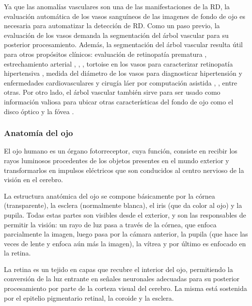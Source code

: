 Ya que las anomal\'ias vasculares son una de las manifestaciones de la RD, la evaluaci\'on autom\'atica de los vasos sangu\'ineos de las imagenes de fondo de ojo es necesaria para automatizar la detecci\'on de RD. Como un paso previo, la evaluaci\'on de los vasos demanda la segmentaci\'on del \'arbol vascular para su posterior procesamiento. Adem\'as, la segmentaci\'on del \'arbol vascular resulta \'util para otros prop\'ositos cl\'inicos: evaluaci\'on de retinopat\'ia prematura \cite{heneghan2002characterization}, estrechamiento arterial \cite{grisan2003divide}, \cite{grisan2003divide}, \cite{ hatanaka2004automated}, tortoise en los vasos para caracterizar retinopat\'ia hipertensiva \cite{foracchia2001extraction}, medida del di\'ametro de los vasos para diagnosticar hipertensi\'on y enfermedades cardiovasculares \cite{gao2001method}  \cite{lowell2004measurement} y cirug\'ia l\'aer por computaci\'on asistida \cite{becker1998image}, \cite{shen2001optimal}, entre otras.
Por otro lado, el \'arbol vascular tambi\'en sirve para ser usado como informaci\'on valiosa para ubicar otras caracter\'isticas del fondo de ojo como el disco \'optico \cite{hoover2003locating} \cite{youssif2008optic} y la f\'ovea \cite{li2004automated}. \cite{marin2011new}


		\subsubsection{Anatom\'ia del ojo}

El ojo humano es un \'organo fotorreceptor, cuya funci\'on, consiste en recibir los rayos luminosos procedentes de los objetos presentes en el mundo exterior y transformarlos en impulsos el\'ectricos que son conducidos al centro nervioso de la visi\'on en el cerebro. 

La estructura anat\'omica del ojo se compone b\'asicamente por la c\'ornea (transparente), la esclera (normalmente blanca), el iris (que da color al ojo) y la pupila. Todas estas partes son visibles desde el exterior, y son las responsables de permitir la visi\'on: un rayo de luz pasa a trav\'es de la c\'ornea, que enfoca parcialmente la imagen, luego pasa por la c\'amara anterior, la pupila (que hace las veces de lente y enfoca a\'un m\'as la imagen), la v\'itrea y por \'ultimo es enfocado en la retina.

La retina es un tejido en capas que recubre el interior del ojo, permitiendo la conversi\'on de la luz entrante en señales neuronales adecuadas para su posterior procesamiento por parte de la corteza visual del cerebro. La misma est\'a sostenida por el epitelio pigmentario retinal, la coroide y la esclera.

